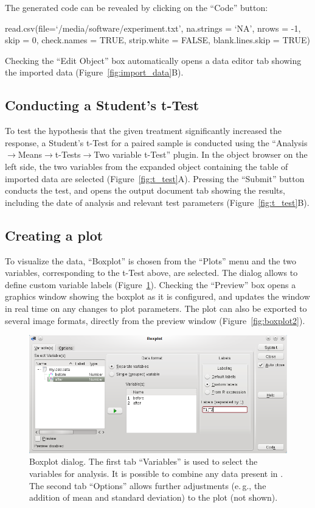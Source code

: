 The generated  code can be revealed by clicking on the ``Code'' button:

\begin{Code}
read.csv(file=`/media/software/experiment.txt',
         na.strings = `NA', nrows = -1, skip = 0,
         check.names = TRUE, strip.white = FALSE, blank.lines.skip = TRUE)
\end{Code}

Checking the ``Edit Object'' box automatically opens a data editor tab
showing the imported data (Figure~\ref{fig:import_data}B).

\subsection{Conducting a Student's t-Test}
\label{sec:conducting_ttest}
To test the hypothesis that the given treatment significantly increased the response, a Student's
t-Test for a paired sample is conducted using the
``Analysis$\rightarrow$Means$\rightarrow$t-Tests$\rightarrow$Two variable t-Test'' plugin.
In the object browser on the left side, the two variables from the expanded
 object containing the table of imported data 
are selected (Figure~\ref{fig:t_test}A). 
Pressing the ``Submit'' button conducts the test, and opens the output document tab
showing the results, including the date of analysis and relevant test parameters (Figure~\ref{fig:t_test}B).


\subsection{Creating a plot}
\label{sec:create_plot}
To visualize the data, ``Boxplot'' is chosen from the ``Plots'' menu
and the two variables, corresponding to the t-Test above, are selected.
The dialog allows to define custom variable labels (Figure~\ref{fig:boxplot1}).
Checking the ``Preview'' box opens a graphics window showing the boxplot as
it is configured, and updates the window in real time on any changes to plot parameters.
The plot can also be exported to several image formats, directly from the preview window (Figure~\ref{fig:boxplot2}).

\begin{figure}[hb!]
 \centering
 \includegraphics[width=15.4cm]{./figures/boxplot1.png}
 \caption{Boxplot dialog. The first tab ``Variables'' is used to select the variables for analysis. It is possible to
  combine any data present in . The second tab ``Options'' allows further adjustments (e.\,g., the addition of mean and standard deviation) to the plot (not shown).}
 \label{fig:boxplot1}
\end{figure}

